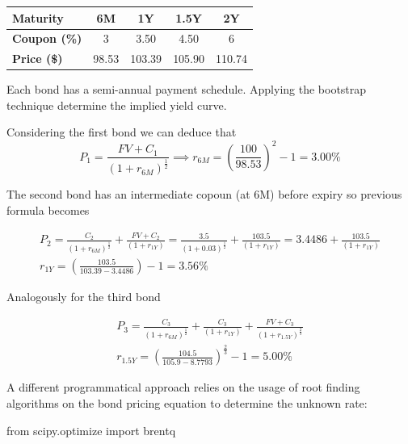 \documentclass[12pt,a4paper]{exam}
\begin{document}
\begin{questions}
\begin{table}[h]
  \begin{center}
    \begin{tabular}{|l|c|c|c|c|}
      \hline
      \textbf{Maturity}    & 6M    & 1Y     & 1.5Y   & 2Y  \\ \hline
      \textbf{Coupon (\%)} & 3     & 3.50   & 4.50   & 6 \\ \hline
      \textbf{Price (\$)}  & 98.53 & 103.39 & 105.90 & 110.74 \\ \hline
    \end{tabular}
    \end{center}
  \end{table}
Each bond has a semi-annual payment schedule. Applying the bootstrap technique determine the implied yield curve.
\fillwithlines{3cm}
\begin{solution}
Considering the first bond we can deduce that
\begin{equation*}
  P_1 = \frac{FV + C_1}{(1+r_{6M})^{\frac{1}{2}}} \implies r_{6M} = \left(\frac{100}{98.53}\right)^{2} -1 = 3.00\%
\end{equation*}

The second bond has an intermediate copoun (at 6M) before expiry so previous formula becomes

\begin{equation*}
  \begin{gathered}
    P_2 =  \frac{C_2}{(1+r_{6M})^{\frac{1}{2}}} + \frac{FV + C_2}{(1+r_{1Y})} = \frac{3.5}{(1+0.03)^{\frac{1}{2}}} + \frac{103.5}{(1+r_{1Y})} = 3.4486 + \frac{103.5}{(1+r_{1Y})}\\
    r_{1Y} = \left(\frac{103.5}{103.39-3.4486}\right)-1 = 3.56\%
  \end{gathered}
\end{equation*}

Analogously for the third bond

\begin{equation*}
  \begin{gathered}
    P_3 =  \frac{C_3}{(1+r_{6M})^{\frac{1}{2}}} + \frac{C_3}{(1+r_{1Y})} +  \frac{FV+C_3}{(1+r_{1.5Y})^{\frac{2}{3}}} \\
    r_{1.5Y} = \left(\frac{104.5}{105.9-8.7793}\right)^{\frac{2}{3}}-1 = 5.00\%
  \end{gathered}
\end{equation*}

A different programmatical approach relies on the usage of root finding algorithms on the bond pricing equation to determine the unknown rate:
\begin{ipython}
from scipy.optimize import brentq


\end{ipython}
\end{solution}
\end{questions}
\end{document}
